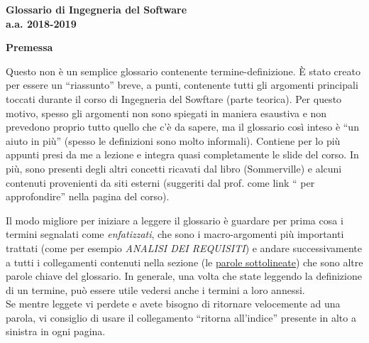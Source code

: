 \documentclass[12pt]{article}
\begin{document}
	\begin{titlepage}
		\centering
		\LARGE \textbf{Glossario di Ingegneria del Software} \\
		\small \textbf{a.a. 2018-2019}
	\end{titlepage}

	\newpage
	\begin{center}
		\textbf{Premessa}
	\end{center}
	Questo non è un semplice glossario contenente termine-definizione. È stato creato per essere un ``riassunto'' breve, a punti, contenente tutti gli argomenti principali toccati durante il corso di Ingegneria del Sowftare (parte teorica). Per questo motivo, spesso gli argomenti non sono spiegati in maniera esaustiva e non prevedono proprio tutto quello che c'è da sapere, ma il glossario così inteso è ``un aiuto in più'' (spesso le definizioni sono molto informali). Contiene per lo più appunti presi da me a lezione e integra quasi completamente le slide del corso. In più, sono presenti degli altri concetti ricavati dal libro (Sommerville) e alcuni contenuti provenienti da siti esterni (suggeriti dal prof. come link `` per approfondire'' nella pagina del corso). \par

	Il modo migliore per iniziare a leggere il glossario è guardare per prima cosa i termini segnalati come \emph{enfatizzati}, che sono i macro-argomenti più importanti trattati (come per esempio \emph{ANALISI DEI REQUISITI}) e andare successivamente a tutti i collegamenti contenuti nella sezione (le \underline{parole sottolineate}) che sono altre parole chiave del glossario. In generale, una volta che state leggendo la definizione di un termine, può essere utile vedersi anche i termini a loro annessi. \\
	Se mentre leggete vi perdete e avete bisogno di ritornare velocemente ad una parola, vi consiglio di usare il collegamento ``ritorna all'indice'' presente in alto a sinistra in ogni pagina.

	\setcounter{secnumdepth}{0}
	\setcounter{tocdepth}{1}

	\newpage
	\tableofcontents
	\clearpage
	\printindex \label{index} %
	\clearpage


	\pagestyle{fancy}
	\fancyhf{}
	\rhead{\hyperref[index]{\color{purple}{Ritorna all'indice}}}
	\rfoot{ \thepage}


	
	
	
	
	
	
	
	
	
	
	
	
	
	
	
	
	
	
	
	
	
	
\end{document}
